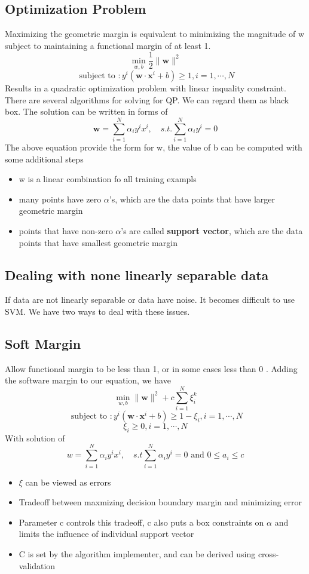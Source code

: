 \documentclass[11pt]{article}
\begin{document}
\subsection{Optimization Problem}
\label{sec:org7923a88}
Maximizing the geometric margin is equivalent to minimizing the magnitude of w subject to maintaining a functional margin of at least 1. 
$$ \min _ { w ,b } \frac { 1} { 2} \| \mathbf { w } \| ^ { 2} $$
$$ \text{ subject to } : y ^ { i } \left( \mathbf { w } \cdot \mathbf { x } ^ { i } + b \right) \geq 1,i = 1,\cdots ,N $$
Results in a quadratic optimization problem with linear inquality constraint. There are several algorithms for solving for QP. We can regard them as black box. The solution can be written in forms of 
$$ \mathbf { w } = \sum _ { i = 1} ^ { N } \alpha _ { i } y ^ { i } x ^ { i } ,\quad s .t .\sum _ { i = 1} ^ { N } \alpha _ { i } y ^ { i } = 0 $$  
The above equation provide the form for w, the value of b can be computed with some additional steps
\begin{itemize}
\item w is a linear combination fo all training exampls
\item many points have zero \(\alpha\)'s, which are the data points that have larger geometric margin
\item points that have non-zero \(\alpha\)'s are called \textbf{\textbf{support vector}}, which are the data points that have smallest geometric margin
\end{itemize}

\subsection{Dealing with none linearly separable data}
\label{sec:orgf2e87c5}
If data are not linearly separable or data have noise. It becomes difficult to use SVM. We have two ways to deal with these issues. 

\subsection{Soft Margin}
\label{sec:org1f94771}
Allow functional margin to be less than 1, or in some cases less than 0 . Adding the software margin to our equation, we have
$$ \min _ { w ,b } \| \mathbf { w } \| ^ { 2} + c \sum _ { i = 1} ^ { N } \xi _ { i } ^ { k } $$
$$
\text{ subject to } : y ^ { i } \left( \mathbf { w } \cdot \mathbf { x } ^ { i } + b \right) \geq 1- \xi _ { i } ,i = 1,\cdots ,N
$$
$$
\xi _ { i } \geq 0,i = 1,\cdots ,N
$$
With solution of 
$$
w = \sum _ { i = 1} ^ { N } \alpha _ { i } y ^ { i } x ^ { i } ,\quad s .t \sum _ { i = 1} ^ { N } \alpha _ { i } y ^ { i } = 0\text{ and } 0\leq a _ { i } \leq c
$$
\begin{itemize}
\item \(\xi\) can be viewed as errors
\item Tradeoff between maxmizing decision boundary margin and minimizing error
\item Parameter c controls this tradeoff, c also puts a box constraints on \(\alpha\) and limits the influence of individual support vector
\item C is set by the algorithm implementer, and can be derived using cross-validation
\end{itemize}
\end{document}
